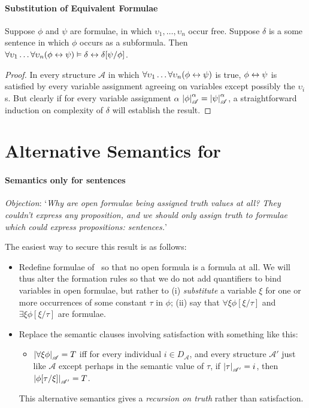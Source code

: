 \paragraph{Substitution of Equivalent Formulae}

\begin{theorem}
	Suppose $\phi$ and $\psi$ are formulae, in which $\upsilon_{1},\ldots,\upsilon_{n}$ occur free. Suppose $\delta$ is a some sentence in which $\phi$ occurs as a subformula. Then $\forall\upsilon_{1}\ldots\forall\upsilon_{n}(\phi\leftrightarrow\psi)\vDash \delta \leftrightarrow \delta[\psi/\phi]$. \begin{proof}
In every structure $\mathscr{A}$ in which $\forall\upsilon_{1}\ldots\forall\upsilon_{n}(\phi\leftrightarrow\psi)$ is true, $\phi\leftrightarrow\psi$ is satisfied by every variable assignment agreeing on variables except possibly the $\upsilon_{i}$s.  But clearly if for every variable assignment $\alpha$ $\left|\phi\right|^{\alpha}_{\mathscr{A}}=\left|\psi\right|^{\alpha}_{\mathscr{A}}$, a straightforward induction on complexity of $\delta$ will establish the result.
	\end{proof}
\end{theorem}




\section{Alternative Semantics for \texorpdfstring{\ltwo}{L2}}
\paragraph{Semantics only for sentences}

\emph{Objection}: `\emph{Why are open formulae being assigned truth values at all? They couldn't express any proposition, and we should only assign truth to formulae which could express propositions: sentences.}'

The easiest way to secure this result is as follows: \begin{itemize}
	\item  Redefine formulae of \ltwo\ so that no open formula is a formula at all. We will thus alter the formation rules so that we do not add quantifiers to bind variables in open formulae, but rather to (i) \emph{substitute} a variable $\xi$ for one
or more occurrences of some constant $\tau$ in $\phi$; (ii) say that $\forall\xi\phi[\xi/\tau]$ and $\exists\xi\phi[\xi/\tau]$ are formulae.
\item Replace the semantic clauses involving satisfaction with something like this:
\begin{itemize}\item $\left|\forall\xi \phi\right|_{\mathscr{A}} = T$  iff  for every
	individual $i \in D_{\mathscr{A}}$, and every structure $\mathscr{A}'$ just like $\mathscr{A}$ except perhaps in the semantic value of $\tau$,
	if $\left|\tau\right|_{\mathscr{A'}}=i$, then $\left|\phi[\tau/\xi]\right|_{\mathscr{A'}}=T$.
\end{itemize}
This alternative semantics gives a \emph{recursion on truth} \label{fiverectr} rather than satisfaction.
\end{itemize}

